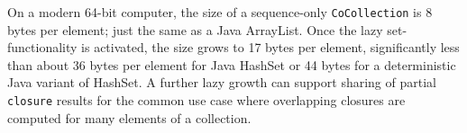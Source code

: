 \documentclass[
]{ceurart}
\begin{document}




On a modern 64-bit computer, the size of a sequence-only \verb!CoCollection! is 8 bytes per element; just the same as a Java ArrayList. Once the lazy set-functionality is activated, the size grows to 17 bytes per element, significantly less than about 36 bytes per element for Java HashSet or 44 bytes for a deterministic Java variant of HashSet. A further lazy growth can support sharing of partial \verb!closure! results for the common use case where overlapping closures are computed for many elements of a collection.
\end{document}
